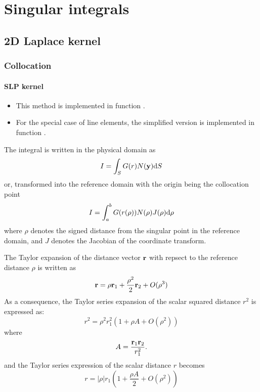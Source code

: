 \chapter{Singular integrals}

\section{2D Laplace kernel}

\subsection{Collocation}

\subsubsection{SLP kernel}

\begin{itemize}
\item This method is implemented in function .
\item For the special case of line elements, the simplified version is implemented in function .
\end{itemize}

The integral is written in the physical domain as
%
\begin{equation}
	I = \int_S G(r) N({\bf y}) \mathrm{d} S
\end{equation}
%
or, transformed into the reference domain with the origin being the collocation point
%
\begin{equation}
	I = \int_a^b G(r(\rho)) N(\rho) J(\rho) \mathrm{d} \rho
\end{equation}
%
where $\rho$ denotes the signed distance from the singular point in the reference domain, and $J$ denotes the Jacobian of the coordinate transform.

The Taylor expansion of the distance vector ${\bf r}$ with repsect to the reference distance $\rho$ is written as
%
\begin{equation}
	{\bf r} = \rho {\bf r}_1 + \frac{\rho^2}{2} {\bf r}_2 + O(\rho^3)
\end{equation}
%
As a consequence, the Taylor series expansion of the scalar squared distance $r^2$ is expressed as:
%
\begin{equation}
	r^2 = \rho^2 r_1^2 (1 + \rho A + O(\rho^2))
\end{equation}
%
where
%
\begin{equation}
	A = \frac{{\bf r}_1 {\bf r}_2}{r_1^2}.
\end{equation}
%
and the Taylor series expression of the scalar distance $r$ becomes
%
\begin{equation}
	r = |\rho| r_1 \left(1 + \frac{\rho A}{2} + O(\rho^2)\right)
\end{equation}

